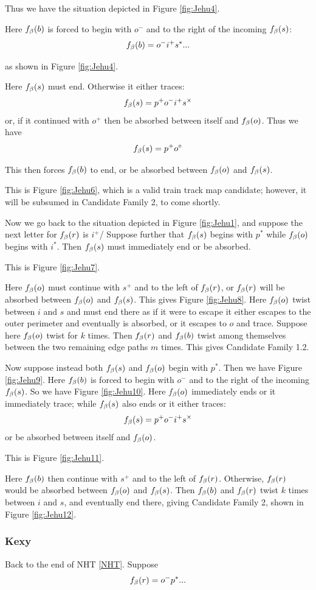 Thus we have the situation depicted in Figure \ref{fig:Jehu4}.

Here $f_\beta(b)$ is forced to begin with $o^-$ and to the right of the incoming $f_\beta(s)$:
\[
f_\beta(b) = o^- i^+ s^*...
\]

as shown in Figure \ref{fig:Jehu4}.

Here $f_\beta(s)$ must end. Otherwise it either traces:
\[
f_\beta(s) = p^+ o^- i^+ s^\times
\]
or, if it continued with $o^+$ then be absorbed between itself and $f_\beta(o)$. Thus we have
\[
f_\beta(s) = p^+ o^\circ
\]

This then forces $f_\beta(b)$ to end, or be absorbed between $f_\beta(o)$ and $f_\beta(s)$.

This is Figure \ref{fig:Jehu6}, which is a valid train track map candidate; however, it will be subsumed in Candidate Family 2, to come shortly.

Now we go back to the situation depicted in Figure \ref{fig:Jehu1}, and suppose the next letter for $f_\beta(r)$ is $i^+$/ Suppose further that $f_\beta(s)$ begins with $p^*$ while $f_\beta(o)$ begins with $i^*$. Then $f_\beta(s)$ must immediately end or be absorbed.

This is Figure \ref{fig:Jehu7}.

Here $f_\beta(o)$ must continue with $s^+$ and to the left of $f_\beta(r)$, or $f_\beta(r)$ will be absorbed between $f_\beta(o)$ and $f_\beta(s)$. This gives Figure \ref{fig:Jehu8}. Here $f_\beta(o)$ twist between $i$ and $s$ and must end there as if it were to escape it either escapes to the outer perimeter and eventually is absorbed, or it escapes to $o$ and trace. Suppose here $f_\beta(o)$ twist for $k$ times. Then $f_\beta(r)$ and $f_\beta(b)$ twist among themselves between the two remaining edge paths $m$ times. This gives Candidate Family 1.2.

Now suppose instead both $f_\beta(s)$ and $f_\beta(o)$ begin with $p^*$. Then we have Figure \ref{fig:Jehu9}. Here $f_\beta(b)$ is forced to begin with $o^-$ and to the right of the incoming $f_\beta(s)$. So we have Figure \ref{fig:Jehu10}. Here $f_\beta(o)$ immediately ends or it immediately trace; while $f_\beta(s)$ also ends or it either traces:
\[
f_\beta(s) = p^+ o^- i^+ s^\times
\]
or be absorbed between itself and  $f_\beta(o)$. 

This is Figure \ref{fig:Jehu11}. 

Here $f_\beta(b)$ then continue with $s^+$ and to the left of $f_\beta(r)$. Otherwise, $f_\beta(r)$ would be absorbed between $f_\beta(o)$ and $f_\beta(s)$. Then $f_\beta(b)$ and $f_\beta(r)$ twist $k$ times between $i$ and $s$, and eventually end there, giving Candidate Family 2, shown in Figure \ref{fig:Jehu12}.

\subsubsection{Kexy}
Back to the end of NHT \ref{NHT}. Suppose
$$f_\beta(r) = o^- p^*...$$

